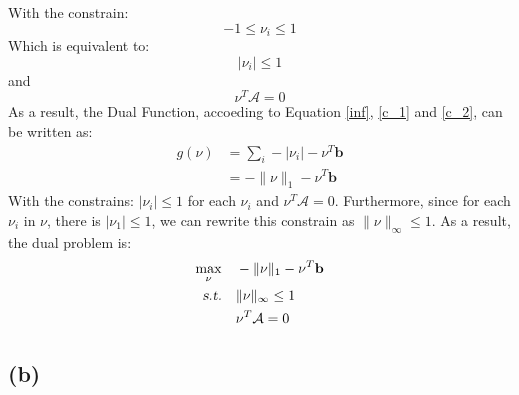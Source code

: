 \documentclass[10pt,a4paper]{article}
\begin{document}
With the constrain:
\begin{equation*}
	-1 \leq \nu_{i} \leq 1
\end{equation*}
Which is equivalent to:
\begin{equation}
	|\nu_{i}| \leq 1
	\label{c_1}
\end{equation}
and 
\begin{equation}
	\nu^{T} \mathcal{A} = 0
	\label{c_2}
\end{equation}
As a result, the Dual Function, accoeding to Equation \ref{inf}, \ref{c_1} and \ref{c_2},  can be written as:
\begin{equation}
	\begin{aligned}
		g(\nu) &= \displaystyle\sum_{i} -|\nu_{i}| - \nu^{T} \mathbf{b} \\
		&= - \| \nu \|_{1} - \nu^{T} \mathbf{b}
	\end{aligned}
\end{equation}
With the constrains: $|\nu_{i}| \leq 1$ for each $\nu_{i}$ and $\nu^{T} \mathcal{A} = 0$. Furthermore, since for each $\nu_{i}$ in $\nu$, there is $ |\nu_{1}| \leq 1$, we can rewrite this constrain as $\| \nu \|_{\infty} \leq 1$. As a result, the dual problem is:
\begin{equation*}
	\begin{aligned}
		\displaystyle\max_{\nu} \quad & - \| \nu \|_{1} - \nu^{T} \mathbf{b} \\
		\textsl{s.t.}  \quad & \| \nu \|_{\infty} \leq 1 \\
		& \nu^{T} \mathcal{A} = 0
	\end{aligned}
\end{equation*}

\subsection*{(b)}
\end{document}
